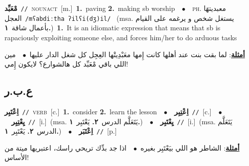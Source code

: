 \documentclass[10pt,a4paper,twoside]{article} %
\begin{document}
\begin{multicols}{2}
{{{\setlength\topsep{0pt}\textbf{\foreignlanguage{arabic}{مْعَبِّد}}\ {\color{gray}\texttt{//}\color{black}}\ \textsc{noun\textunderscore act}\ [m.]\ \textbf{1.}~paving  \textbf{2.}~making sb worship\ \ $\bullet$\ \ \textsc{ph.} \color{gray} \foreignlanguage{arabic}{معبديتهَا العجل}\color{black}\ {\color{gray}\texttt{/{\sffamily mʕabdiːtha ʔilʕi(dʒ)il}/}\color{black}}\ \color{gray} (msa. \foreignlanguage{arabic}{يستغل شخص و يرغمه على القيام بأعمال شاقة}~\foreignlanguage{arabic}{\textbf{١.}})\color{black}\ \textbf{1.}~It is an idiomatic expression that means that sb is rapaciously exploiting someone else, and forces him/her to do arduous tasks\  \begin{flushright}\color{gray}\foreignlanguage{arabic}{\textbf{\underline{\foreignlanguage{arabic}{أمثلة}}}: لما بقت بنت عند أهلها كانت إِمها معَبْدِيتْها العِجِل كل شغل الدار عليها\ $\bullet$\ \  مين اللي باقي مْعَبِّد كل هالشوارع؟ لايكون إِمي!}\end{flushright}\color{black}} \vspace{2mm}

\vspace{-3mm}
\subsection*{\color{blue}\foreignlanguage{arabic}{ع.ب.ر}\color{blue}{}} 

{\setlength\topsep{0pt}\textbf{\foreignlanguage{arabic}{اِعْتَبِر}}\ {\color{gray}\texttt{//}\color{black}}\ \textsc{verb}\ [c.]\ \textbf{1.}~consider  \textbf{2.}~learn the lesson\ \ $\bullet$\ \ \setlength\topsep{0pt}\textbf{\foreignlanguage{arabic}{اِعْتِبِر}}\ {\color{gray}\texttt{//}\color{black}}\ [c.]\ \ $\bullet$\ \ \setlength\topsep{0pt}\textbf{\foreignlanguage{arabic}{يِعْتِبِر}}\ {\color{gray}\texttt{//}\color{black}}\ [i.]\ \color{gray}(msa. \foreignlanguage{arabic}{يَتَعَلَّم الدرس}~\foreignlanguage{arabic}{\textbf{٢.}}  \foreignlanguage{arabic}{يَعْتَبِر}~\foreignlanguage{arabic}{\textbf{١.}})\color{black}\ \ $\bullet$\ \ \setlength\topsep{0pt}\textbf{\foreignlanguage{arabic}{يِعْتَبِر}}\ {\color{gray}\texttt{//}\color{black}}\ [i.]\ \color{gray}(msa. \foreignlanguage{arabic}{يَتَعَلَّم الدرس}~\foreignlanguage{arabic}{\textbf{٢.}}  \foreignlanguage{arabic}{يَعْتَبِر}~\foreignlanguage{arabic}{\textbf{١.}})\color{black}\ \ $\bullet$\ \ \setlength\topsep{0pt}\textbf{\foreignlanguage{arabic}{اِعْتَبَر}}\ {\color{gray}\texttt{//}\color{black}}\ [p.]\  \begin{flushright}\color{gray}\foreignlanguage{arabic}{\textbf{\underline{\foreignlanguage{arabic}{أمثلة}}}: الشاطر هو اللي بيَعْتَبِر بغيره\ $\bullet$\ \  اذا جد بدِّك تريحي راسك، اعتبريها ميتة من الأساس!}\end{flushright}\color{black}} \vspace{2mm}

}}
\end{multicols}
\end{document}
